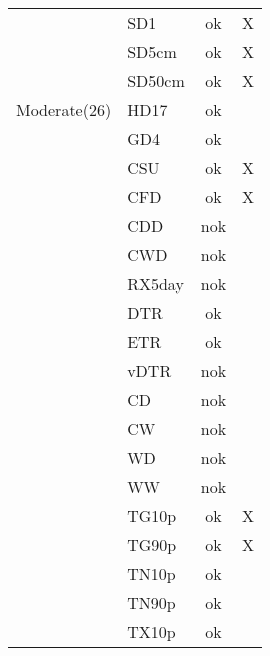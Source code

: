 \documentclass[a4paper,11pt]{article}
\begin{document}
\begin{table}[h]
\begin{tabular}{l l c c}
                     &  SD1      &   ok             &          X            \\   
                     &  SD5cm    &   ok             &          X            \\       
                     &  SD50cm   &   ok             &          X            \\
        Moderate(26) &  HD17     &   ok             &                       \\
                     &  GD4      &   ok             &                       \\
                     &  CSU      &   ok             &          X            \\
                     &  CFD      &   ok             &          X            \\
                     &  CDD      &   nok            &                       \\
                     &  CWD      &   nok            &                       \\
                     &  RX5day   &   nok            &                       \\
                     &  DTR      &   ok             &                       \\
                     &  ETR      &   ok             &                       \\
                     &  vDTR     &   nok            &                       \\    
                     &  CD       &   nok            &                       \\
                     &  CW       &   nok            &                       \\
                     &  WD       &   nok            &                       \\
                     &  WW       &   nok            &                       \\
                     &  TG10p    &   ok             &          X            \\
                     &  TG90p    &   ok             &          X            \\
                     &  TN10p    &   ok             &                       \\
                     &  TN90p    &   ok             &                       \\
                     &  TX10p    &   ok             &                       \\

\end{tabular}
\end{table}
\end{document}
